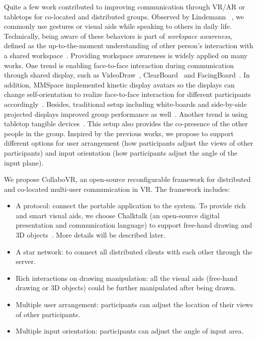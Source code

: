 \documentclass{sigchi}
\begin{document}
Quite a few work contributed to improving communication through VR/AR or tabletops for co-located and distributed groups. Observed by Lindemann ~\cite{tversky2003human}, we commonly use gestures or visual aids while speaking to others in daily life. Technically, being aware of these behaviors is part of \textit{workspace awareness}, defined as the up-to-the-moment understanding of other person's interaction with a shared workspace~\cite{li2014interactive}. Providing workspace awareness is widely applied on many works. 
One trend is enabling face-to-face interaction during communication through shared display, such as VideoDraw~\cite{tang1990videodraw}, ClearBoard~\cite{ishii1993integration} and FacingBoard~\cite{li2014interactive}. In addition, MMSpace implemented kinetic display avatars so the displays can change self-orientation to realize face-to-face interaction for different participants accordingly~\cite{otsuka2016mmspace}. Besides, traditional setup including white-boards and side-by-side projected displays improved group performance as well~\cite{plaue2009presence}. Another trend is using tabletop tangible devices~\cite{brave1998tangible, kunert2019multi}. 
This setup also provides the co-presence of the other people in the group. Inspired by the previous works, we propose to support different options for user arrangement (how participants adjust the views of other participants) and input orientation (how participants adjust the angle of the input plane).

We propose CollaboVR, an open-source reconfigurable framework for distributed and co-located multi-user communication in VR. The framework includes:
\begin{itemize}
    \item A protocol: connect the portable application to the system. To provide rich and smart visual aids, we choose Chalktalk (an open-source digital presentation and communication language) to support free-hand drawing and 3D objects~\cite{perlin2018chalktalk}. More details will be described later.
    \item A star network: to connect all distributed clients with each other through the server.
    \item Rich interactions on drawing manipulation: all the visual aids (free-hand drawing or 3D objects) could be further manipulated after being drawn.
    \item Multiple user arrangement: participants can adjust the location of their views of other participants.
    \item Multiple input orientation: participants can adjust the angle of input area.
\end{itemize}
\end{document}
